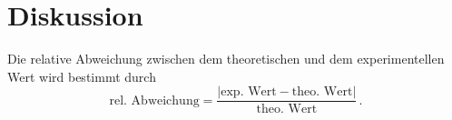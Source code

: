 \section{Diskussion}
\label{sec:Diskussion}
Die relative Abweichung zwischen dem theoretischen und dem experimentellen Wert wird bestimmt durch
$$\text{rel. Abweichung} = \frac{|\text{exp. Wert} - \text{theo. Wert}|}{\text{theo. Wert}}\,.$$